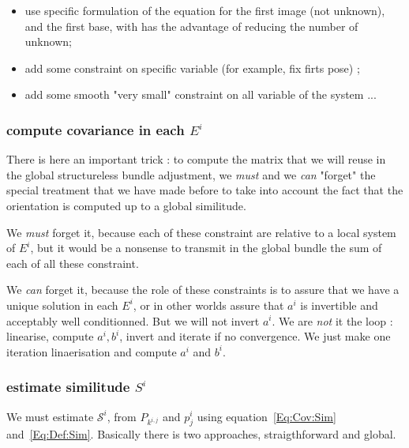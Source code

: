\begin{itemize}
    \item use specific formulation of the equation for the first image (not unknown), and the first base,
          with has the advantage of reducing the number of unknown;
          
    \item add some constraint on specific variable (for example, fix firts pose) ;

    \item add some smooth "very small" constraint on all variable of the system ...
\end{itemize}


\subsubsection{compute  covariance  in each $E^i$}

\label{StrucLess:Comp:Cov}
There is here an important trick : to compute the matrix that we will
reuse in the global structureless bundle adjustment, we \emph{must} and we \emph{can} 
"forget" the special treatment that we have made  before to  take into account the fact
that the orientation is computed up to a global similitude.

We \emph{must} forget it, because each of these constraint are relative to  a local 
system of $E^i$, but it would be a nonsense to transmit in the global bundle the sum
of each of all these constraint.

We \emph{can} forget it, because the role of these constraints is to assure that we have a
unique solution in each $E^i$, or in other worlds assure that $a^i$ is invertible and
acceptably well conditionned. But we will not invert $a^i$. We are \emph{not} it the loop :
linearise, compute $a^i, b^i$, invert and iterate if no convergence. We just make one iteration
linaerisation and compute $a^i$ and $b^i$.


\subsubsection{estimate  similitude $S^i$}

We must estimate $\mathcal{S}^i$, from $P_{k^{i,j}}$  and $p^i_j$ using equation~\ref{Eq:Cov:Sim} and~\ref{Eq:Def:Sim}.
Basically there is two approaches, straigthforward and global.

